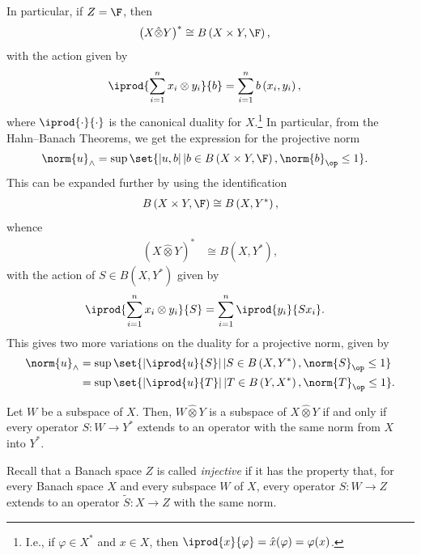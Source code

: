 \documentclass[10pt]{mypackage}
\begin{document}
In particular, if $Z = \F$, then
\begin{align*}
  \left( X\hat\otimes Y \right)^{\ast} &\cong B\left( X\times Y,\F \right),
\end{align*}
with the action given by
\begin{align*}
  \iprod{\sum_{i=1}^{n}x_i\otimes y_i}{b} &= \sum_{i=1}^{n}b\left( x_i,y_i \right),
\end{align*}
where $ \iprod{\cdot}{\cdot} $ is the canonical duality for $X$.\footnote{I.e., if $\varphi\in X^{\ast}$ and $x\in X$, then $ \iprod{x}{\varphi} = \hat{x}(\varphi) = \varphi(x) $.} In particular, from the Hahn--Banach Theorems, we get the expression for the projective norm
\begin{align*}
  \norm{u}_{\wedge} &= \sup\set{\left\vert u,b \right\vert | b\in B\left( X\times Y,\F \right),\norm{b}_{\op}\leq 1}.
\end{align*}
This can be expanded further by using the identification
\begin{align*}
  B\left( X\times Y,\F \right)\cong B\left( X,Y^{\ast} \right),
\end{align*}
whence
\begin{align*}
  \left( X\hat\otimes Y \right)^{\ast} &\cong B\left( X,Y^{\ast} \right),
\end{align*}
with the action of $S\in B\left( X,Y^{\ast} \right)$ given by
\begin{align*}
  \iprod{\sum_{i=1}^{n}x_i\otimes y_i}{S} &= \sum_{i=1}^{n} \iprod{y_i}{Sx_i}.
\end{align*}
This gives two more variations on the duality for a projective norm, given by
\begin{align*}
  \norm{u}_{\wedge} &= \sup\set{\left\vert \iprod{u}{S} \right\vert | S\in B\left( X,Y^{\ast} \right),\norm{S}_{\op}\leq 1}\\
                    &= \sup\set{\left\vert \iprod{u}{T} \right\vert | T\in B\left( Y,X^{\ast} \right),\norm{T}_{\op}\leq 1}.
\end{align*}
\begin{corollary}
  Let $W$ be a subspace of $X$. Then, $W\hat\otimes Y$ is a subspace of $X\hat\otimes Y$ if and only if every operator $S\colon W\rightarrow Y^{\ast}$ extends to an operator with the same norm from $X$ into $Y^{\ast}$.
\end{corollary}
Recall that a Banach space $Z$ is called \textit{injective} if it has the property that, for every Banach space $X$ and every subspace $W$ of $X$, every operator $S\colon W\rightarrow Z$ extends to an operator $ \widetilde{S}\colon X\rightarrow Z $ with the same norm.
\end{document}
